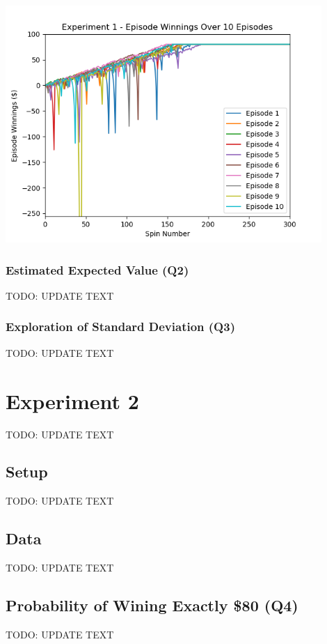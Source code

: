 \documentclass[
	letterpaper, %
]{jdf}
\begin{document}
\begin{jdffigure}
\includegraphics[height=9cm]{Figures/figure1.png}%
\label{fig:figure1}%
\end{jdffigure}

\subsubsection{Estimated Expected Value (Q2)}
TODO: UPDATE TEXT

\subsubsection{Exploration of Standard Deviation (Q3)}
TODO: UPDATE TEXT

\section{Experiment 2}
TODO: UPDATE TEXT

\subsection{Setup}
TODO: UPDATE TEXT

\subsection{Data}
TODO: UPDATE TEXT

\subsection{Probability of Wining Exactly \$80 (Q4)}
TODO: UPDATE TEXT
\end{document}
